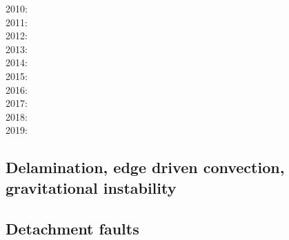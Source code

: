 {2010: \cite{hamo10}\cite{fasm10}\cite{grpy10}\cite{vago10}\cite{plmf10}\cite{spgs10a}\cite{pygp10}
      \cite{jabw10}\\
2011: \cite{rera11}\cite{chss11}\\
2012: \cite{wagw12}\cite{vacl12}\cite{buit12}\cite{kogp12}\cite{gohg12}\cite{trub12}\\
2013: \cite{wazh13}\cite{krcu13}\cite{frbm13}\cite{wagw13}\cite{duyp13}\cite{rugb13}
      \cite{scdg13}\\
2014: \cite{kava14}\cite{dusp14}\cite{wavp14}\cite{whbb14}\cite{scml14}
      \cite{mals14}\cite{gupm14}\cite{gahs14}\cite{mutg14}\\
2015: \cite{wavp15}\cite{thkp15}\cite{mags15}\cite{duys15}\\
2016: \cite{wahz16}\\
2017: \cite{rugb17}\cite{ozgw17}\cite{vomc17}\cite{taac17}\\
2018: \cite{wavp18}\cite{nigw18}\cite{bemc18}\\
2019: \cite{koen19}\cite{kipd19}\cite{crcm19}\cite{pedm19}
}

\subsection{Delamination, edge driven convection, gravitational instability} 

{\scriptsize
\noindent
\cite{kian95}
\cite{kian98}\cite{scsc98}
\cite{kiri00}\cite{scys00}
\cite{modo04}
\cite{elki07}
\cite{gopy08}
\cite{vabv10}
\cite{vavg12}
\cite{krcu13}\cite{sths13}
\cite{baeg14}
\cite{wahz15}
\cite{bems17}
\cite{peka18}
}

\subsection{Detachment faults} 

